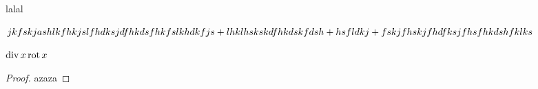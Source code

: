 \documentclass{article}
\begin{document}
    
    \fsrheader
    
    \begin{thm}
        lalal
    \end{thm}
    
    
    $jkfskjashlkfhkjslfhdksjdfhkdsfhkfslkhdkfjs+lhklhskskdfhkdskfdsh\hm+ hsfldkj\hm+fskjfhskjfhdfksjfhsfhkdshfklks$
    
    $\mathop{\operatorname{div}} x \operatorname{rot} x$
    
    \begin{proof}
    azaza
    \end{proof}
    
\end{document}
